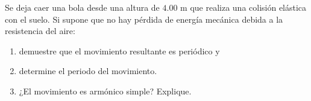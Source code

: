 \item Se deja caer una bola desde una altura de $4.00\text{ m}$ que realiza una colisión elástica con el suelo. Si supone que no hay pérdida de energía mecánica debida a la resistencia del aire:
\begin{enumerate}
    \item demuestre que el movimiento resultante es periódico y
    \item determine el periodo del movimiento.
    \item ¿El movimiento es armónico simple? Explique.
\end{enumerate}
